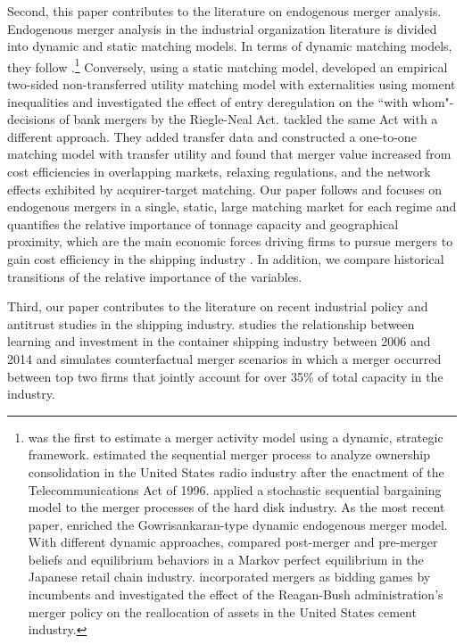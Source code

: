 \documentclass[10pt]{article}
\begin{document}
{Second, this paper contributes to the literature on endogenous merger analysis. 
Endogenous merger analysis in the industrial organization literature is divided into dynamic and static matching models. 
In terms of dynamic matching models, they follow \cite{gowrisankaran1999dynamic}.\footnote{\cite{stahl2011dynamic} was the first to estimate a merger activity model using a dynamic, strategic framework. \cite{jeziorski2014effects} estimated the sequential merger process to analyze ownership consolidation in the United States radio industry after the enactment of the Telecommunications Act of 1996. \cite{igami2019mergers} applied a stochastic sequential bargaining model to the merger processes of the hard disk industry. As the most recent paper, \cite{hollenbeck2020horizontal} enriched the Gowrisankaran-type dynamic endogenous merger model. With different dynamic approaches, \cite{nishida2015better} compared post-merger and pre-merger beliefs and equilibrium behaviors in a Markov perfect equilibrium in the Japanese retail chain industry. \cite{perez2015building} incorporated mergers as bidding games by incumbents and investigated the effect of the Reagan-Bush administration's merger policy on the reallocation of assets in the United States cement industry.} Conversely, using a static matching model, \cite{uetake2019entry} developed an empirical two-sided non-transferred utility matching model with externalities using moment inequalities and investigated the effect of entry deregulation on the ``with whom"-decisions of bank mergers by the Riegle-Neal Act. 
\cite{akkus2015ms} tackled the same Act with a different approach. 
They added transfer data and constructed a one-to-one matching model with transfer utility and found that merger value increased from cost efficiencies in overlapping markets, relaxing regulations, and the network effects exhibited by acquirer-target matching. 
Our paper follows \cite{akkus2015ms} and focuses on endogenous mergers in a single, static, large matching market for each regime and quantifies the relative importance of tonnage capacity and geographical proximity, which are the main economic forces driving firms to pursue mergers to gain cost efficiency in the shipping industry \citep{notteboom2004container}. 
In addition, we compare historical transitions of the relative importance of the variables.

Third, our paper contributes to the literature on recent industrial policy and antitrust studies in the shipping industry. \cite{jeon2022learning} studies the relationship between learning and investment in the container shipping industry between 2006 and 2014 and simulates counterfactual merger scenarios in which a merger occurred between top two firms that jointly account for over 35\% of total capacity in the industry.
\textcolor{blue}{\cite{Sys2009TransPOL}}}
\end{document}
